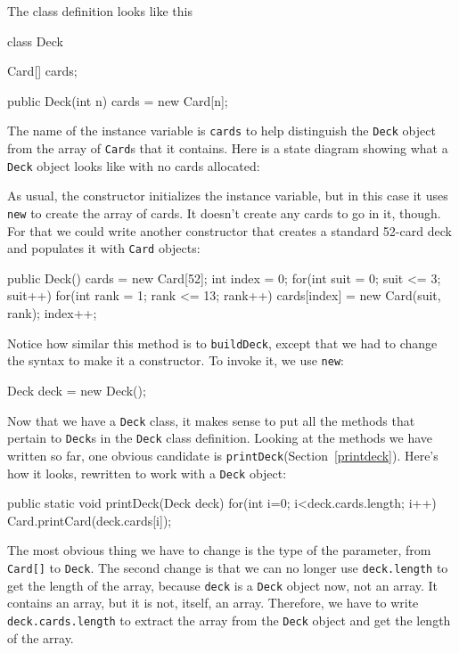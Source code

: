 \documentclass{book}
\begin{document}

The class definition looks like this

\begin{verbatimtab}
class Deck {
    Card[] cards;

    public Deck(int n) {
        cards = new Card[n];
    }
}
\end{verbatimtab}
%
The name of the instance variable is {\tt cards} to help
distinguish the {\tt Deck} object from the array of {\tt Card}s
that it contains.  Here is a state diagram showing what a
{\tt Deck} object looks like with no cards allocated:



As usual, the constructor initializes the instance variable, but in
this case it uses {\tt new} to create the array of cards.
It doesn't create any cards to go in it, though.  For that we could
write another constructor that creates a standard 52-card deck and
populates it with {\tt Card} objects:

\begin{verbatimtab}
public Deck() {
    cards = new Card[52];
    int index = 0;
    for(int suit = 0; suit <= 3; suit++) {
        for(int rank = 1; rank <= 13; rank++) {
            cards[index] = new Card(suit, rank);
            index++;
        }
    }
}
\end{verbatimtab}

Notice how similar this method is to {\tt buildDeck}, except
that we had to change the syntax to make it a constructor.
To invoke it, we use {\tt new}:


\begin{verbatimtab}
    Deck deck = new Deck();
\end{verbatimtab}
%
Now that we have a {\tt Deck} class, it makes sense to put
all the methods that pertain to {\tt Deck}s in the {\tt Deck}
class definition.  Looking at the methods we have written so
far, one obvious candidate is {\tt printDeck}(Section~\ref{printdeck}).
Here's how it looks, rewritten to work with a {\tt Deck}
object:


\begin{verbatimtab}
public static void printDeck(Deck deck) {
    for(int i=0; i<deck.cards.length; i++) {
        Card.printCard(deck.cards[i]);
    }
}
\end{verbatimtab}
%
The most obvious thing we have to change is the type of the parameter,
from {\tt Card[]} to {\tt Deck}.  The second change is that we can no
longer use {\tt deck.length} to get the length of the array, because
{\tt deck} is a {\tt Deck} object now, not an array.  It contains an
array, but it is not, itself, an array.  Therefore, we have to write
{\tt deck.cards.length} to extract the array from the {\tt Deck}
object and get the length of the array.
\end{document}
